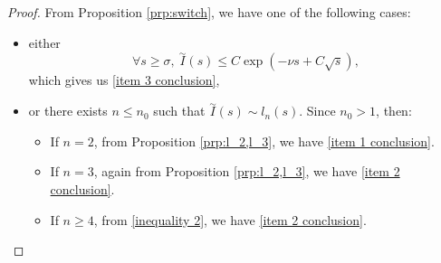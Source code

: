 \documentclass[11pt,a4paper]{article}
\newcommand{\1}{\mathbbm{1}}
\numberwithin{equation}{section}
\theoremstyle{remark}
\begin{document}
\begin{proof}
From Proposition \ref{prp:switch}, we have one of the following cases:
\begin{itemize}
\item either 
\begin{equation*}
\forall s\geq \sigma,\ \overset{\sim}{I}(s)\leq C \exp(-\nu s+C\sqrt{s}),
\end{equation*}
which gives us \ref{item 3 conclusion},

\item or there exists $n\leq n_0$ such that $\overset{\sim}{I}(s)\sim l_n(s)$. Since $n_0>1$, then:

\begin{itemize}
\item If $n=2$, from Proposition \ref{prp:l_2,l_3}, we have \ref{item 1 conclusion}. 
\item If  $n=3$, again from Proposition \ref{prp:l_2,l_3}, we have \ref{item 2 conclusion}.
\item If $n\geq 4$, from \eqref{inequality 2}, we have \ref{item 2 conclusion}.
\end{itemize}
\end{itemize}
\end{proof}
\end{document}
